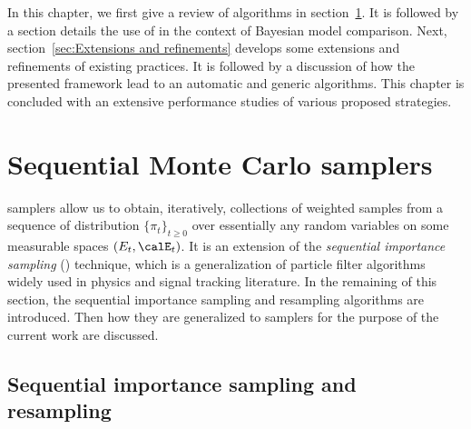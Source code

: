 In this chapter, we first give a review of \smc algorithms in
section~\ref{sec:Sequential Monte Carlo samplers}. It is followed by a section
details the use of \smc in the context of Bayesian model comparison. Next,
section~\ref{sec:Extensions and refinements} develops some extensions and
refinements of existing practices. It is followed by a discussion of how the
presented framework lead to an automatic and generic algorithms. This chapter
is concluded with an extensive performance studies of various proposed
strategies.

\section{Sequential Monte Carlo samplers}
\label{sec:Sequential Monte Carlo samplers}

\smc samplers allow us to obtain, iteratively, collections of weighted samples
from a sequence of distribution $\{\pi_t\}_{t\ge0}$ over essentially any
random variables on some measurable spaces $(E_t,\calE_t)$. It is an extension
of the \emph{sequential importance sampling} (\sis) technique, which is a
generalization of particle filter algorithms widely used in physics and signal
tracking literature. In the remaining of this section, the sequential
importance sampling and resampling algorithms are introduced. Then how they
are generalized to \smc samplers for the purpose of the current work are
discussed.

\subsection{Sequential importance sampling and resampling}
\label{sub:Sequential importance sampling and resampling}

